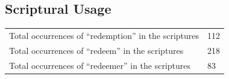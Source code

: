 
\subsection{Scriptural Usage} %
	\label{REDEMPTION-SCRIPTURES}
	
	\begin{tabular}{ll}
		Total occurrences of ``redemption'' in the scriptures & 112 \\
		Total occurrences of ``redeem'' in the scriptures & 218 \\ %
		Total occurrences of ``redeemer'' in the scriptures & 83
	\end{tabular}

	
	
			
			
		
			
